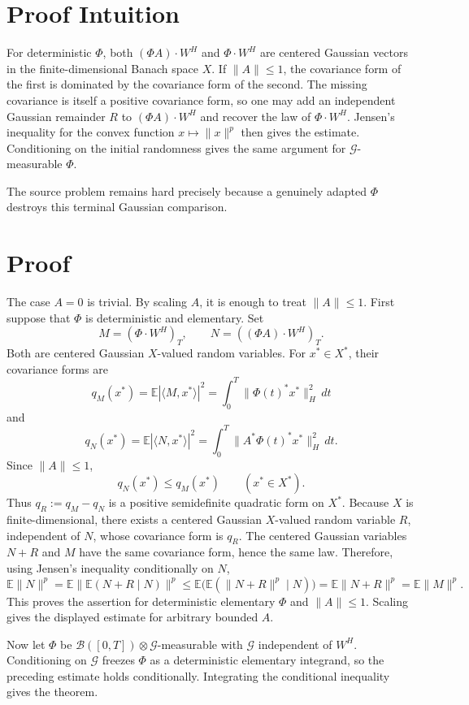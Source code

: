 \documentclass[11pt]{article}
\newcommand{\E}{\mathbb E}
\begin{document}
\section*{Proof Intuition}

For deterministic \(\Phi\), both \((\Phi A)\cdot W^H\) and
\(\Phi\cdot W^H\) are centered Gaussian vectors in the finite-dimensional
Banach space \(X\).  If \(\|A\|\leq 1\), the covariance form of the first is
dominated by the covariance form of the second.  The missing covariance is
itself a positive covariance form, so one may add an independent Gaussian
remainder \(R\) to \((\Phi A)\cdot W^H\) and recover the law of
\(\Phi\cdot W^H\).  Jensen's inequality for the convex function
\(x\mapsto\|x\|^p\) then gives the estimate.  Conditioning on the initial
randomness gives the same argument for \(\mathcal G\)-measurable \(\Phi\).

The source problem remains hard precisely because a genuinely adapted
\(\Phi\) destroys this terminal Gaussian comparison.

\section*{Proof}

The case \(A=0\) is trivial.  By scaling \(A\), it is enough to treat
\(\|A\|\leq 1\).  First suppose that
\(\Phi\) is deterministic and elementary.  Set
\[
 M=(\Phi\cdot W^H)_T,\qquad N=((\Phi A)\cdot W^H)_T.
\]
Both are centered Gaussian \(X\)-valued random variables.  For \(x^*\in X^*\),
their covariance forms are
\[
 q_M(x^*)=\E|\langle M,x^*\rangle|^2
   =\int_0^T \|\Phi(t)^*x^*\|_H^2\,dt
\]
and
\[
 q_N(x^*)=\E|\langle N,x^*\rangle|^2
   =\int_0^T \|A^*\Phi(t)^*x^*\|_H^2\,dt.
\]
Since \(\|A\|\leq 1\),
\[
 q_N(x^*)\leq q_M(x^*)\qquad (x^*\in X^*).
\]
Thus \(q_R:=q_M-q_N\) is a positive semidefinite quadratic form on \(X^*\).
Because \(X\) is finite-dimensional, there exists a centered Gaussian
\(X\)-valued random variable \(R\), independent of \(N\), whose covariance
form is \(q_R\).  The centered Gaussian variables \(N+R\) and \(M\) have the
same covariance form, hence the same law.  Therefore, using Jensen's
inequality conditionally on \(N\),
\[
 \E\|N\|^p
 = \E\bigl\|\E(N+R\mid N)\bigr\|^p
 \leq \E\bigl(\E(\|N+R\|^p\mid N)\bigr)
 = \E\|N+R\|^p
 = \E\|M\|^p .
\]
This proves the assertion for deterministic elementary \(\Phi\) and
\(\|A\|\leq 1\).  Scaling gives the displayed estimate for arbitrary bounded
\(A\).

Now let \(\Phi\) be
\(\mathcal B([0,T])\otimes\mathcal G\)-measurable with \(\mathcal G\)
independent of \(W^H\).  Conditioning on \(\mathcal G\) freezes \(\Phi\) as a
deterministic elementary integrand, so the preceding estimate holds
conditionally.  Integrating the conditional inequality gives the theorem.
\end{document}

